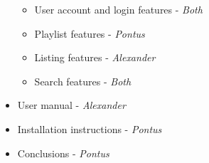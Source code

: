 \begin{itemize}
        \begin{itemize}
            \item User account and login features - \emph{Both}
            \item Playlist features - \emph{Pontus}
            \item Listing features - \emph{Alexander}
            \item Search features - \emph{Both}
        \end{itemize}
    \item User manual - \emph{Alexander}
    \item Installation instructions - \emph{Pontus}
    \item Conclusions - \emph{Pontus}
\end{itemize}
